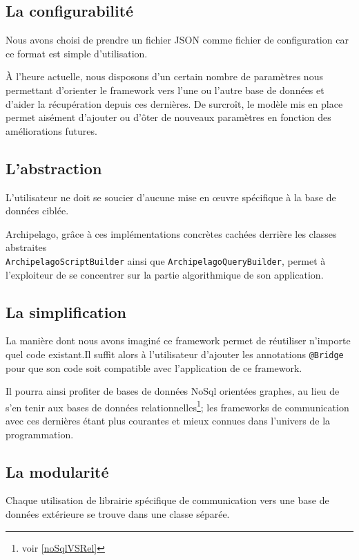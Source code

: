\documentclass[a4paper,fleqn,12pt,oneside]{report}
\begin{document}
\subsection{La configurabilité}

Nous avons choisi de prendre un fichier JSON comme fichier de configuration car ce format est simple d'utilisation. 

\`A l'heure actuelle, nous disposons d'un certain nombre de paramètres nous permettant d'orienter le framework vers l'une ou l'autre base de données et d'aider la récupération depuis ces dernières. De surcroît, le modèle mis en place permet aisément d'ajouter ou d'ôter de nouveaux paramètres en fonction des améliorations futures. 
\newpage
\subsection{L'abstraction}

L'utilisateur ne doit se soucier d'aucune mise en œuvre spécifique à la base de données ciblée. 

Archipelago, grâce à ces  implémentations concrètes cachées derrière les classes abstraites \\\texttt{ArchipelagoScriptBuilder} ainsi que \texttt{ArchipelagoQueryBuilder}, permet à l'exploiteur de se concentrer sur la partie algorithmique de son application.

\subsection{La simplification}

La manière dont nous avons imaginé ce framework permet de réutiliser n'importe quel code existant.Il suffit alors à l'utilisateur d'ajouter les annotations \texttt{@Bridge} pour que son code soit compatible avec l'application de ce framework. 

Il pourra ainsi profiter de bases de données NoSql orientées graphes, au lieu de s'en tenir aux bases de données relationnelles\footnote{voir \ref{noSqlVSRel}}; les frameworks de communication avec ces dernières étant plus courantes et mieux connues dans l'univers de la programmation.

\subsection{La modularité}

Chaque utilisation de librairie spécifique de communication vers une base de données extérieure se trouve dans une classe séparée.
\end{document}
